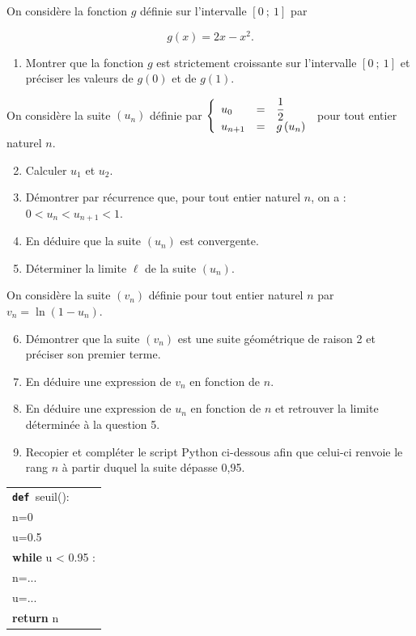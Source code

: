 On considère la fonction $g$ définie sur l'intervalle $[0~;~1]$ par 

\[g(x) = 2x - x^{2}.\]

\smallskip

\begin{enumerate}
\item Montrer que la fonction $g$ est strictement croissante sur l'intervalle $[0~;~1]$ et préciser les valeurs de $g(0)$ et de $g(1)$.
\end{enumerate}

On considère la suite $\left(u_{n}\right)$ définie par $\left\{\begin{array}{l c l}u_{0}&=&\dfrac{1}{2}\\ u_{n+1}&=&g\left(u_{n}\right)\end{array}\right.$ pour tout entier naturel $n$.

\begin{enumerate}
\setcounter{enumi}{1}
\item Calculer $u_{1}$ et $u_{2}$.

\item Démontrer par récurrence que, pour tout entier naturel $n$, on a : $0 < u_{n} < u_{n+1}< 1$.
\item En déduire que la suite $\left(u_{n}\right)$ est convergente.
\item Déterminer la limite $\ell$ de la suite $\left(u_{n}\right)$.
\end{enumerate}

On considère la suite $\left(v_{n}\right)$ définie pour tout entier naturel $n$ par $v_{n}=\ln \left(1 - u_{n}\right)$.

\begin{enumerate}
\setcounter{enumi}{5}
\item Démontrer que la suite $\left(v_{n}\right)$ est une suite géométrique de raison 2 et préciser son premier terme.
\item En déduire une expression de $v_{n}$ en fonction de $n$.
\item En déduire une expression de $u_{n}$ en fonction de $n$ et retrouver la limite déterminée à la question 5.
\item Recopier et compléter le script Python ci-dessous afin que celui-ci renvoie le rang $n$ à partir duquel la suite dépasse 0,95.
\end{enumerate}

\begin{center}
\begin{tabular}{|>{\texttt} l|}\hline

\textbf{def }seuil():\\
\qquad n=0\\
\qquad u=0.5\\
\qquad \textbf{while} u < 0.95 :\\
\qquad \qquad n=...\\
\qquad \qquad u=...\\
\qquad \textbf{return} n\\ \hline
\end{tabular}

\end{center}
